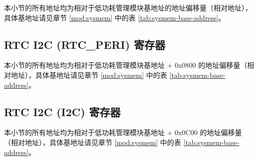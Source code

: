 \documentclass[main\_\_CN.tex]{subfiles}
\begin{document}
本小节的所有地址均为相对于低功耗管理模块基地址的地址偏移量（相对地址），具体基地址请见章节 \ref{mod:sysmem} \textit{} 中的表 \ref{tab:sysmem-base-address}。



\subsection{RTC I2C (RTC\_PERI) 寄存器}

本小节的所有地址均为相对于低功耗管理模块基地址 + 0x{}0800 的地址偏移量（相对地址），具体基地址请见章节 \ref{mod:sysmem} \textit{} 中的表 \ref{tab:sysmem-base-address}。



\subsection{RTC I2C (I2C) 寄存器}

本小节的所有地址均为相对于低功耗管理模块基地址 + 0x{}0C00 的地址偏移量（相对地址），具体基地址请见章节 \ref{mod:sysmem} \textit{} 中的表 \ref{tab:sysmem-base-address}。


\end{document}
